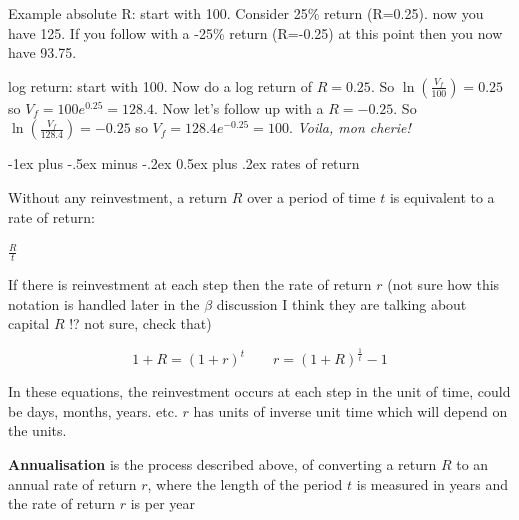 \documentclass[10pt,landscape]{article}
\makeatletter
\renewcommand{\section}{\@startsection{section}{1}{0mm}%
                                {-1ex plus -.5ex minus -.2ex}%
                                {0.5ex plus .2ex}%
                                {\normalfont\large\bfseries}}
\makeatother
\begin{document}
\begin{multicols}{3}
\vspace{0.25cm}

Example absolute R: start with 100. Consider 25\% return (R=0.25). now you have 125. If you follow with a -25\% return (R=-0.25) at this point then you now have 93.75. 

\vspace{0.25cm}

log return: start with 100. Now do a log return of $R=0.25$. So $\ln\left(\frac{V_f}{100}\right) =0.25$ so $V_f = 100e^{0.25} = 128.4$. Now let's follow up with a $R = -0.25$. So $\ln\left(\frac{V_f}{128.4}\right) = - 0.25$ so  $V_f = 128.4e^{-0.25}= 100$. \textit{Voila, mon cherie!}



\section{rates of return}

\vspace{0.25cm}

Without any reinvestment, a return $R$ over a period of time $t$ 
is equivalent to a rate of return:

\vspace{0.25cm}

$\frac{R}{t}$

\vspace{0.25cm}

If there is reinvestment at each step then the rate of return $r$ (not sure how this notation is handled later in the $\beta$ discussion I think they are talking about capital $R$ !? not sure, check that)

\vspace{0.25cm}

$$1+R = (1+r)^t \qquad r = (1+R)^{\frac{1}{t}}-1$$

\vspace{0.25cm}

In these equations, the reinvestment occurs at each step in the unit of time, could be days, months, years. etc. $r$ has units of inverse unit time which will depend on the units.

\vspace{0.25cm}

\textbf{Annualisation} is the process described above, of converting a return 
$R$ to an annual rate of return $r$, where the length of the period $t$ is measured in years and the rate of return $r$ is per year

\vspace{0.25cm}


\end{multicols}
\end{document}
